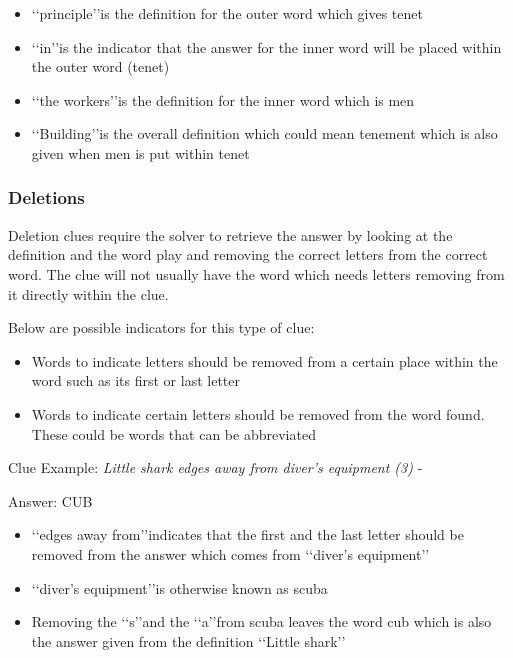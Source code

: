 \begin{itemize}
	\item \lq\lq principle\rq\rq is the definition for the outer word which gives tenet 
	\item \lq\lq in\rq\rq is the indicator that the answer for the inner word will be placed within the outer word (tenet) 
	\item \lq\lq the workers\rq\rq is the definition for the inner word which is men 
	\item \lq\lq Building\rq\rq is the overall definition which could mean tenement which is also given when men is put within tenet 
\end{itemize}

\subsubsection{Deletions}

Deletion clues require the solver to retrieve the answer by looking at the definition and the word play and removing the correct letters from the correct word. The clue will not usually have the word which needs letters removing from it directly within the clue.  

Below are possible indicators for this type of clue:
\begin{itemize}
 	\item Words to indicate letters should be removed from a certain place within the word such as its first or last letter 
	\item Words to indicate certain letters should be removed from the word found. These could be words that can be abbreviated 
\\
\end{itemize}

Clue Example: \emph{Little shark edges away from diver's equipment (3)}  - \citep{shuchiDeletions09}  

Answer: CUB 

\begin{itemize}
	\item \lq\lq edges away from\rq\rq indicates that the first and the last letter should be removed from the answer which comes from \lq\lq diver’s equipment\rq\rq
	\item \lq\lq diver’s equipment\rq\rq is otherwise known as scuba  
	\item Removing the \lq\lq s\rq\rq and the \lq\lq a\rq\rq from scuba leaves the word cub which is also the answer given from the definition \lq\lq Little shark\rq\rq
\end{itemize}

